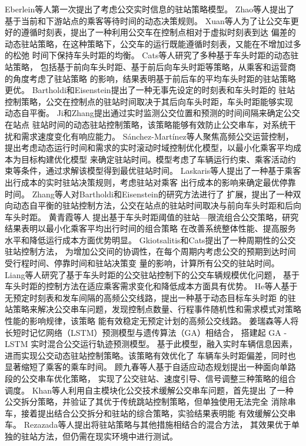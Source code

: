 Eberlein等人\cite{eberlein2001holding}第一次提出了考虑公交实时信息的驻站策略模型。
Zhao等人\cite{zhao2003distributed}提出了基于当前和下游站点的乘客等待时间的动态决策规则。
Xuan等人\cite{xuan2011dynamic}为了让公交车更好的遵循时刻表，提出了一种利用公交车在控制点相对于虚拟时刻表到达
偏差的动态驻站策略，在这种策略下，公交车的运行既能遵循时刻表，又能在不增加过多的松弛
时间下保持车头时距的均衡。
Cats等人\cite{cats2011impacts}研究了多种基于车头时距的动态驻站策略，
包括基于前向车头时距、基于前后向车头时距等策略，从乘客和运营商的角度考虑了驻站策略
的影响，结果表明基于前后车的平均车头时距的驻站策略更优。
Bartholdi和Eisenstein\cite{bartholdi2012self}提出了一种无事先设定的时刻表和车头时距的
驻站控制策略，公交在控制点的驻站时间取决于其后向车头时距，车头时距能够实现
动态自平衡。
Ji和Zhang\cite{ji2013dynamic}提出通过实时监测公交位置和预测的时间间隔来确定公交在站点
驻站时间的动态驻站控制策略，该策略能够有效防止公交串车，对系统干扰和需求速度变化有响应能力。
Sánchez-Martínez等人\cite{sanchez2016real}聚焦高频公交运营控制，
提出考虑动态运行时间和需求的实时滚动时域控制优化模型，以最小化乘客平均成本为目标构建优化模型
来确定驻站时间。模型考虑了车辆运行约束、乘客活动约束等条件，通过求解该模型得到最优驻站时间。
Laskaris等人\cite{laskaris2016real}提出了一种基于乘客出行成本的实时驻站决策规则，考虑驻站对乘客
出行成本的影响来确定最优停靠时间。
Zhang等人\cite{zhang2018two}对Bartholdi和Eisenstein\cite{bartholdi2012self}的研究方法进行了
扩展，提出了一种双向动态自平衡的驻站控制方法，公交在站点的驻站时间取决与前向车头时距和后向车头时距。
黄青霞等人\cite{黄青霞2018基于驻站和限流的组合公交控制策略研究}
提出基于车头时距阈值的驻站—限流组合公交策略，研究结果表明以最小化乘客平均出行时间的组合策略
在改善系统整体性能、提高服务水平和降低运行成本方面优势明显。
Gkiotsalitis和Cats\cite{gkiotsalitis2019multi}提出了一种周期性的公交驻站控制方法，
为增加公交间的协调性，在每个周期内考虑公交的预期到达时间受行程时间、停靠时间和驻站决策变
量的影响，计算所有公交的驻站时间。
Liang等人\cite{liang2019multiobjective}研究了基于车头时距的公交驻站控制下的公交车辆规模优化问题，
基于车头时距的控制方法在适应乘客需求变化和降低成本方面具有优势。
He等人\cite{he2020holding}基于无预定时刻表和发车间隔的高频公交线路，提出一种基于动态目标车头时距
的驻站策略来解决公交串车问题，发现控制点数量、行程事件随机性和需求模式对策略性能的影响规律，该策略
能有效稳定无预定计划的高频公交线路。
姜瑞森等人\cite{姜瑞森__2023}将长短时记忆网络（LSTM）预测模型与遗传算法（GA）相结合，
搭建起 GA - LSTM 实时混合公交运行轨迹预测模型。
基于此模型，融入实时车辆信息因素，进而实现公交动态驻站控制策略。该策略有效优化了
车辆车头时距偏差，同时也显著缩短了乘客的乘车时间。
顾九春等人\cite{Gu2023}基于自适应动态规划提出一种面向单路段的公交串车优化策略，
实现了公交驻站、速度引导、信号调整三种策略的组合调度。
Khan等人利用自主模块化公交技术缓解公交串车问题，首先提出
了一种公交拆分策略\cite{khan2023application}，并验证了其优于传统跳站控制策略，但单独使用无法完全
消除串车，接着提出结合公交拆分和驻站的综合策略\cite{khan2023bus}，实验结果表明能
有效缓解公交串车。
Rezazada等人\cite{rezazada2024bus}提出将驻站策略与其他措施相结合的混合方法，
其效果优于单独的驻站方法，但仍需在现实环境中进行测试。

